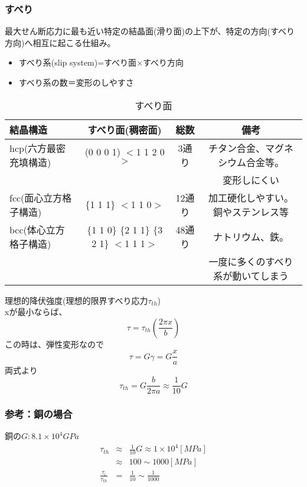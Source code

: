 \documentclass[a4j,twoside,openright,11pt]{jreport}
\begin{document}
\subsubsection{すべり}
最大せん断応力に最も近い特定の結晶面(滑り面)の上下が、特定の方向(すべり方向)へ相互に起こる仕組み。\\
\begin{itemize}
\item すべり系(slip system)=すべり面$\times$すべり方向
\item すべり系の数＝変形のしやすさ
\end{itemize}
\begin{table}[htb]
\begin{center}
  \caption{すべり面}
\small
  \begin{tabular}{|l||c|c|c|} \hline
結晶構造&すべり面(稠密面)                       &総数   &備考\\
\hline
hcp(六方最密充填構造) &(0 0 0 1) $<$1 1 2 0$>$             &3通り  &チタン合金、マグネシウム合金等。\\
                      &                                 &        &変形しにくい\\
\hline
fcc(面心立方格子構造) &$\bigl\{$1 1 1$\bigr\}$  $<$1 1 0$>$                &12通り &加工硬化しやすい。銅やステンレス等\\
\hline
bcc(体心立方格子構造) &$\bigl\{$1 1 0$\bigr\}$ $\bigl\{$2 1 1$\bigr\}$ $\bigl\{$3 2 1$\bigr\}$ $<$1 1 1$>$ &48通り &ナトリウム、鉄。\\
&&&一度に多くのすべり系が動いてしまう\\
\hline
  \end{tabular}
\end{center}
\end{table}
\normalsize

理想的降伏強度(理想的限界すべり応力$\tau_{th}$)\\
xが最小ならば、
\begin{equation}
\tau = \tau_{th}(\frac{2 \pi x}{b})
\end{equation}
この時は、弾性変形なので
\begin{equation}
\tau = G\gamma = G\frac{x}{a}
\end{equation}
両式より
\begin{equation}
\tau_{th} = G \frac{b}{2 \pi a} \approx \frac{1}{10} G
\end{equation}

\subsubsection{参考：銅の場合}
銅の$G:8.1 \times 10^4 GPa$\\
\begin{eqnarray}
\tau_{th} &\approx& \frac{1}{10}G \approx 1\times 10^4        [MPa]\\
         &\approx& 100 \sim 1000                                [MPa]\\
\frac{\tau_{i}}{\tau_{th}} &=& \frac{1}{10} \sim \frac{1}{1000}
\end{eqnarray}
\end{document}
